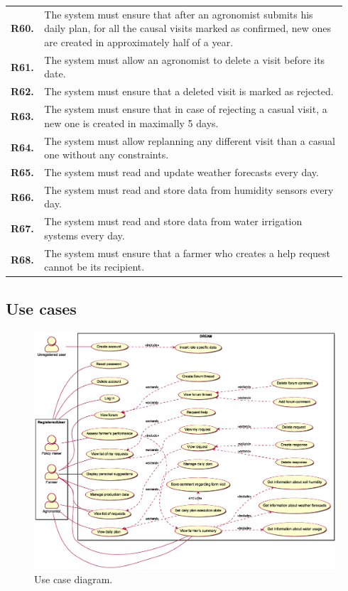 \begin{longtable}{@{}p{0.06\linewidth} p{0.88\linewidth}}
	\textbf{R60.} & The system must ensure that after an agronomist submits his daily plan, for all the causal visits marked as confirmed, new ones are created in approximately half of a year.\\
	\textbf{R61.} & The system must allow an agronomist to delete a visit before its date.\\
	\textbf{R62.} & The system must ensure that a deleted visit is marked as rejected.\\
	\textbf{R63.} & The system must ensure that in case of rejecting a casual visit, a new one is created in maximally 5 days.\\
	\textbf{R64.} & The system must allow replanning any different visit than a casual one without any constraints.\\
	
	\textbf{R65.} & The system must read and update weather forecasts every day. \\
	\textbf{R66.} & The system must read and store data from humidity sensors every day. \\
	\textbf{R67.} & The system must read and store data from water irrigation systems every day. \\
	\textbf{R68.} & The system must ensure that a farmer who creates a help request cannot be its recipient.\\
		
	\bottomrule
\end{longtable}

\subsection{Use cases}
\begin{figure}[H]
    \centering
    \includegraphics[width=\textwidth, keepaspectratio, origin=c, angle=0]{diagrams/use_case}
    \caption{Use case diagram.}
    \label{fig:uc_diagram}
\end{figure}

